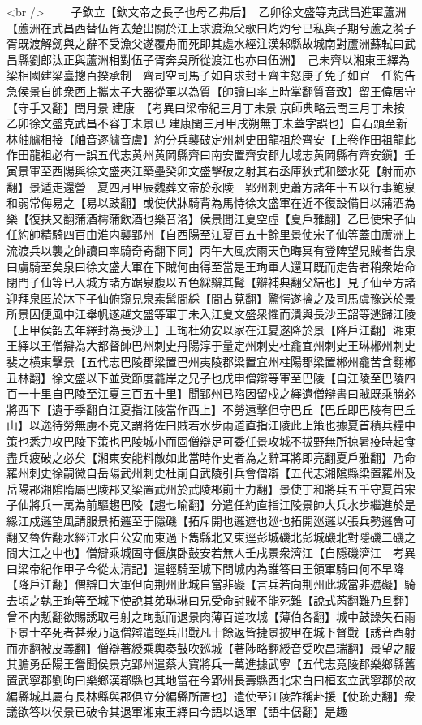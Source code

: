 <br />
　　子欽立【欽文帝之長子也母乙弗后】　乙卯徐文盛等克武昌進軍蘆洲【蘆洲在武昌西替伍胥去楚出關於江上求渡漁父歌曰灼灼兮已私與子期兮蘆之漪子胥既渡解劒與之辭不受漁父遂覆舟而死即其處水經注漢邾縣故城南對蘆洲蘇軾曰武昌縣劉郎汰正與蘆洲相對伍子胥奔吳所從渡江也亦曰伍洲】　己未齊以湘東王繹為梁相國建梁臺摠百揆承制　齊司空司馬子如自求封王齊主怒庚子免子如官　任約告急侯景自帥衆西上攜太子大器從軍以為質【帥讀曰率上時掌翻質音致】留王偉居守【守手又翻】閏月景建康　【考異曰梁帝紀三月丁未景京師典略云閏三月丁未按乙卯徐文盛克武昌不容丁未景已建康閏三月甲戌朔無丁未蓋字誤也】自石頭至新林舳艫相接【舳音逐艫音盧】約分兵襲破定州刺史田龍祖於齊安【上卷作田祖龍此作田龍祖必有一誤五代志黄州黄岡縣齊曰南安置齊安郡九域志黄岡縣有齊安鎭】壬寅景軍至西陽與徐文盛夾江築壘癸卯文盛擊破之射其右丞庫狄式和墜水死【射而亦翻】景遁走還營　夏四月甲辰魏葬文帝於永陵　郢州刺史蕭方諸年十五以行事鮑泉和弱常侮易之【易以豉翻】或使伏牀騎背為馬恃徐文盛軍在近不復設備日以蒲酒為樂【復扶又翻蒲酒樗蒲飲酒也樂音洛】侯景聞江夏空虛【夏戶雅翻】乙巳使宋子仙任約帥精騎四百由淮内襲郢州【自西陽至江夏百五十餘里景使宋子仙等蓋由蘆洲上流渡兵以襲之帥讀曰率騎奇寄翻下同】丙午大風疾雨天色晦冥有登陴望見賊者告泉曰虜騎至矣泉曰徐文盛大軍在下賊何由得至當是王珣軍人還耳既而走告者稍衆始命閉門子仙等已入城方諸方踞泉腹以五色綵辮其髯【辮補典翻父結也】見子仙至方諸迎拜泉匿於牀下子仙俯窺見泉素髯間綵【間古莧翻】驚愕遂擒之及司馬虞豫送於景所景因便風中江舉帆遂越文盛等軍丁未入江夏文盛衆懼而潰與長沙王韶等逃歸江陵【上甲侯韶去年繹封為長沙王】王珣杜幼安以家在江夏遂降於景【降戶江翻】湘東王繹以王僧辯為大都督帥巴州刺史丹陽淳于量定州刺史杜龕宜州刺史王琳郴州刺史裴之横東擊景【五代志巴陵郡梁置巴州夷陵郡梁置宜州柱陽郡梁置郴州龕苦含翻郴丑林翻】徐文盛以下並受節度龕岸之兄子也戊申僧辯等軍至巴陵【自江陵至巴陵四百一十里自巴陵至江夏三百五十里】聞郢州已陷因留戍之繹遺僧辯書曰賊既乘勝必將西下【遺于季翻自江夏指江陵當作西上】不勞遠擊但守巴丘【巴丘即巴陵有巴丘山】以逸待勞無虜不克又謂將佐曰賊若水步兩道直指江陵此上策也據夏首積兵糧中策也悉力攻巴陵下策也巴陵城小而固僧辯足可委任景攻城不拔野無所掠暑疫時起食盡兵疲破之必矣【湘東安能料敵如此當時作史者為之辭耳將即亮翻夏戶雅翻】乃命羅州刺史徐嗣徽自岳陽武州刺史杜崱自武陵引兵會僧辯【五代志湘隂縣梁置羅州及岳陽郡湘隂隋屬巴陵郡又梁置武州於武陵郡崱士力翻】景使丁和將兵五千守夏首宋子仙將兵一萬為前驅趨巴陵【趨七喻翻】分遣任約直指江陵景帥大兵水步繼進於是緣江戍邏望風請服景拓邏至于隱磯【拓斥開也邏遮也廵也拓開廵邏以張兵勢邏魯可翻又魯佐翻水經江水自公安而東過下雋縣北又東逕彭城磯北彭城磯北對隱磯二磯之間大江之中也】僧辯乘城固守偃旗卧鼔安若無人壬戌景衆濟江【自隱磯濟江　考異曰梁帝紀作甲子今從太清記】遣輕騎至城下問城内為誰答曰王領軍騎曰何不早降【降戶江翻】僧辯曰大軍但向荆州此城自當非礙【言兵若向荆州此城當非遮礙】騎去頃之執王珣等至城下使說其弟琳琳曰兄受命討賊不能死難【說式芮翻難乃旦翻】曾不内慙翻欲賜誘取弓射之珣慙而退景肉薄百道攻城【薄伯各翻】城中鼓譟矢石雨下景士卒死者甚衆乃退僧辯遣輕兵出戰凡十餘返皆捷景披甲在城下督戰【誘音酉射而亦翻被皮義翻】僧辯著綬乘輿奏鼓吹廵城【著陟略翻綬音受吹昌瑞翻】景望之服其膽勇岳陽王詧聞侯景克郢州遣蔡大寶將兵一萬進據武寧【五代志竟陵郡樂鄉縣舊置武寧郡劉昫曰樂鄉漢鄀縣也其地當在今郢州長壽縣西北宋白曰桓玄立武寧郡於故編縣城其屬有長林縣與郡俱立分編縣所置也】遣使至江陵詐稱赴援【使疏吏翻】衆議欲答以侯景已破令其退軍湘東王繹曰今語以退軍【語牛倨翻】是趣